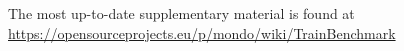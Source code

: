 \documentclass[12pt,twoside,a4paper]{report}
\begin{document}
The most up-to-date supplementary material is found at \url{https://opensourceprojects.eu/p/mondo/wiki/TrainBenchmark}


%










\clearpage



\end{document}
